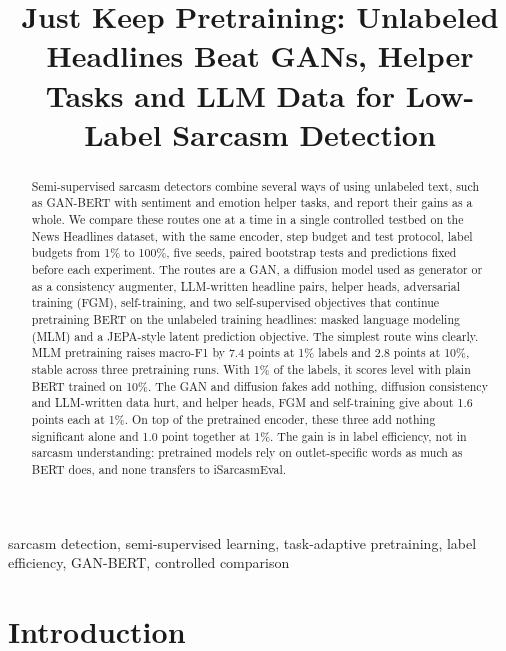 \documentclass[conference]{IEEEtran}
\begin{document}
\title{Just Keep Pretraining: Unlabeled Headlines Beat GANs, Helper Tasks and LLM Data for Low-Label Sarcasm Detection}

\author{
}

\maketitle

\begin{abstract}
Semi-supervised sarcasm detectors combine several ways of using unlabeled text, such as GAN-BERT with sentiment and emotion helper tasks, and report their gains as a whole. We compare these routes one at a time in a single controlled testbed on the News Headlines dataset, with the same encoder, step budget and test protocol, label budgets from 1\% to 100\%, five seeds, paired bootstrap tests and predictions fixed before each experiment. The routes are a GAN, a diffusion model used as generator or as a consistency augmenter, LLM-written headline pairs, helper heads, adversarial training (FGM), self-training, and two self-supervised objectives that continue pretraining BERT on the unlabeled training headlines: masked language modeling (MLM) and a JEPA-style latent prediction objective. The simplest route wins clearly. MLM pretraining raises macro-F1 by 7.4 points at 1\% labels and 2.8 points at 10\%, stable across three pretraining runs. With 1\% of the labels, it scores level with plain BERT trained on 10\%. The GAN and diffusion fakes add nothing, diffusion consistency and LLM-written data hurt, and helper heads, FGM and self-training give about 1.6 points each at 1\%. On top of the pretrained encoder, these three add nothing significant alone and 1.0 point together at 1\%. The gain is in label efficiency, not in sarcasm understanding: pretrained models rely on outlet-specific words as much as BERT does, and none transfers to iSarcasmEval.
\end{abstract}

\begin{IEEEkeywords}
sarcasm detection, semi-supervised learning, task-adaptive pretraining, label efficiency, GAN-BERT, controlled comparison
\end{IEEEkeywords}

\section{Introduction}
\end{document}
